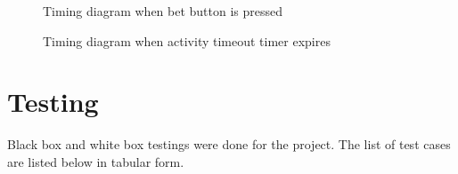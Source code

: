 \documentclass[a4paper,13pt,openany,sffamily]{memoir}
\begin{document}
\begin{figure}[h]
\caption{Timing diagram when bet button is pressed }
\label{Fig_Bet_Timing}
\end{figure}

\begin{figure}[h]
\caption{Timing diagram when activity timeout timer expires }
\label{Fig_Timer_Timing}
\end{figure}

\chapter {Testing}
Black box and white box testings were done for the project. The list of test cases are listed below in tabular form.
\end{document}

